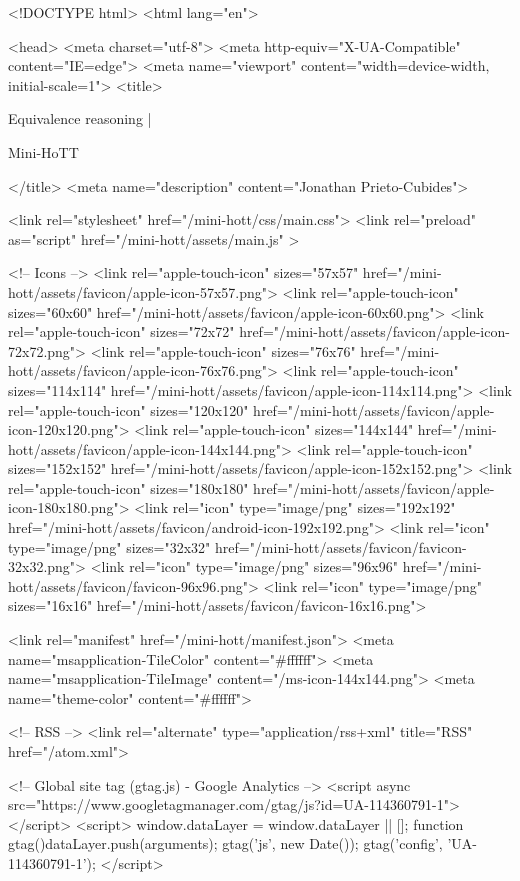 <!DOCTYPE html>
<html lang="en">

<head>
  <meta charset="utf-8">
  <meta http-equiv="X-UA-Compatible" content="IE=edge">
  <meta name="viewport" content="width=device-width, initial-scale=1">
  <title>
    
      
        Equivalence reasoning |
      
        Mini-HoTT
    
  </title>
  <meta name="description" content="Jonathan Prieto-Cubides">

  <link rel="stylesheet" href="/mini-hott/css/main.css">
  <link rel="preload" as="script" href="/mini-hott/assets/main.js" >

  <!-- Icons -->
  <link rel="apple-touch-icon" sizes="57x57" href="/mini-hott/assets/favicon/apple-icon-57x57.png">
  <link rel="apple-touch-icon" sizes="60x60" href="/mini-hott/assets/favicon/apple-icon-60x60.png">
  <link rel="apple-touch-icon" sizes="72x72" href="/mini-hott/assets/favicon/apple-icon-72x72.png">
  <link rel="apple-touch-icon" sizes="76x76" href="/mini-hott/assets/favicon/apple-icon-76x76.png">
  <link rel="apple-touch-icon" sizes="114x114" href="/mini-hott/assets/favicon/apple-icon-114x114.png">
  <link rel="apple-touch-icon" sizes="120x120" href="/mini-hott/assets/favicon/apple-icon-120x120.png">
  <link rel="apple-touch-icon" sizes="144x144" href="/mini-hott/assets/favicon/apple-icon-144x144.png">
  <link rel="apple-touch-icon" sizes="152x152" href="/mini-hott/assets/favicon/apple-icon-152x152.png">
  <link rel="apple-touch-icon" sizes="180x180" href="/mini-hott/assets/favicon/apple-icon-180x180.png">
  <link rel="icon" type="image/png" sizes="192x192"  href="/mini-hott/assets/favicon/android-icon-192x192.png">
  <link rel="icon" type="image/png" sizes="32x32" href="/mini-hott/assets/favicon/favicon-32x32.png">
  <link rel="icon" type="image/png" sizes="96x96" href="/mini-hott/assets/favicon/favicon-96x96.png">
  <link rel="icon" type="image/png" sizes="16x16" href="/mini-hott/assets/favicon/favicon-16x16.png">

  <link rel="manifest" href="/mini-hott/manifest.json">
  <meta name="msapplication-TileColor" content="#ffffff">
  <meta name="msapplication-TileImage" content="/ms-icon-144x144.png">
  <meta name="theme-color" content="#ffffff">

  <!-- RSS -->
  <link rel="alternate" type="application/rss+xml" title="RSS" href="/atom.xml">

  <!-- Global site tag (gtag.js) - Google Analytics -->
  <script async src="https://www.googletagmanager.com/gtag/js?id=UA-114360791-1"></script>
  <script>
    window.dataLayer = window.dataLayer || [];
    function gtag(){dataLayer.push(arguments);}
    gtag('js', new Date());
    gtag('config', 'UA-114360791-1');
  </script>


